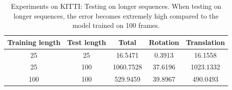 		\begin{table}[tb]
			\small
			\begin{center}
				\begin{tabular}{|c|c||c|c|c|}
					\hline
					Training length & Test length 	& Total 	& Rotation	& Translation	\\ \hline
					25				& 25			& 16.5471	& 0.3913	& 16.1558		\\ \hline
					25				& 100			& 1060.7528	& 37.6196	& 1023.1332		\\ \hline
					100				& 100			& 529.9459	& 39.8967	& 490.0493		\\ \hline
				\end{tabular}
			\end{center}
			\caption[Experiments on KITTI: Testing on longer sequences]
					{Experiments on KITTI: Testing on longer sequences. 
					 When testing on longer sequences, the error becomes extremely high compared to the model trained on 100 frames.
					 \label{tbl:kitti-testing-on-longer-sequences}}
		\end{table}
	
